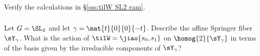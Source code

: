 \subsubsection{} Verify the calculations in \S\ref{sss:tilW SL2 ram}.


\subsubsection{} Let $G=\SL_{2}$ and let $\gamma=\mat{t}{0}{0}{-t}$. Describe the affine Springer fiber $\sY_{\gamma}$. What is the action of $\tilW=\jiao{s_{0},s_{1}}$ on $\homog{2}{\sY_{\gamma}}$ in terms of the basis given by the irreducible components of $\sY_{\gamma}$? 






